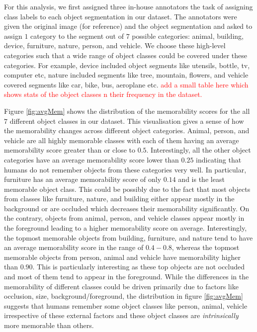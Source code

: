 For this analysis, we first assigned three in-house annotators the task of assigning class labels to each object segmentation in our dataset. The annotators were given the original image (for reference) and the object segmentation and asked to assign $1$ category to the segment out of $7$ possible categories: animal, building, device, furniture, nature, person, and vehicle. We choose these high-level categories such that a wide range of object classes could be covered under these categories. For example, device included object segments like utensils, bottle, tv, computer etc, nature included segments like tree, mountain, flowers, and vehicle covered segments like car, bike, bus, aeroplane etc. \textcolor{red}{add a small table here which shows stats of the object classes n their frequency in the dataset.}

Figure \ref{fig:avgMem} shows the distribution of the memorability scores for the all $7$ different object classes in our dataset. This visualisation gives a sense of how the memorability changes across different object categories. Animal, person, and vehicle are all highly memorable classes with each of them having an average memorability score greater than or close to $0.5$. Interestingly, all the other object categories have an average memorability score lower than $0.25$ indicating that humans do not remember objects from these categories very well. In particular, furniture has an average memorability score of only $0.14$ and is the least memorable object class. This could be possibly due to the fact that most objects from classes like furniture, nature, and building either appear mostly in the background or are occluded which decreases their memorability significantly. On the contrary, objects from animal, person, and vehicle classes appear mostly in the foreground leading to a higher memorability score on average. Interestingly, the topmost memorable objects from building, furniture, and nature tend to have an average memorability score in the range of $0.4 - 0.8$, whereas the topmost memorable objects from person, animal and vehicle have memorability higher than $0.90$. This is particularly interesting as these top objects are not occluded and most of them tend to appear in the foreground. While the differences in the memorability of different classes could be driven primarily due to factors like occlusion, size, background/foreground, the distribution in figure \ref{fig:avgMem} suggests that humans remember some object classes like person, animal, vehicle irrespective of these external factors and these object classes are \textit{intrinsically} more memorable than others.
